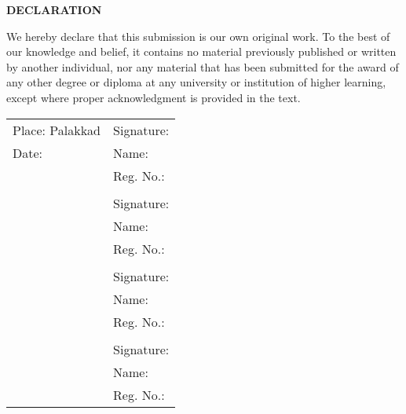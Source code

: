 \newpage
\thispagestyle{empty}
\begin{center}
	\fontsize{16}{18} \textbf{DECLARATION}
\end{center}

\vspace{0.2in}
	\fontsize{12}{14}
	We hereby declare that this submission is our own original work. To the best of our knowledge and belief, it contains no material previously published or written by another individual, nor any material that has been submitted for the award of any other degree or diploma at any university or institution of higher learning, except where proper acknowledgment is provided in the text.


\begin{flushleft}
	\begin{tabular}{p{} p{}}
		Place: Palakkad 	& Signature: \\
		Date: 				& Name: \grpmema \\
							& Reg. No.: \memnuma \\
							& \\
							& Signature: \\
							& Name: \grpmemb \\
							& Reg. No.: \memnumb \\
							& \\
							& Signature: \\
							& Name: \grpmemc \\
							& Reg. No.: \memnumc \\
							& \\
							& Signature: \\
							& Name: \grpmemd \\
							& Reg. No.: \memnumd \\
	\end{tabular}
\end{flushleft}